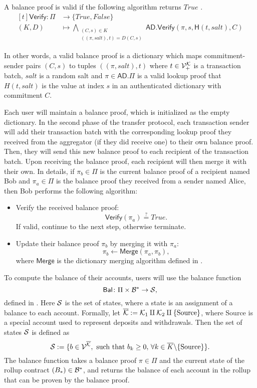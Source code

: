 A balance proof is valid if the following algorithm returns \(True\) \href{https://github.com/\repo FVIntmax/BalanceProof.lean#L60}{\ExternalLink}.
\[
	\begin{aligned}[t]
		\mathsf{Verify} \colon \Pi & \to \{True,False\}                       \\
		(K,D)                      & \mapsto \bigwedge_{\substack{(C,s) \in K \\ ((\pi,salt), t) = D(C,s)}} \mathsf{AD.Verify}(\pi,s,\mathsf{H}(t,salt),C)
	\end{aligned}\]

In other words, a valid balance proof is a dictionary which maps commitment-sender pairs \((C,s)\) to tuples \(((\pi,salt), t)\) where \(t \in \V_+^{\K}\) is a transaction batch, \(salt\) is a random salt and \(\pi \in \mathsf{AD}.\Pi\) is a valid lookup proof that \(H(t,salt)\) is the value at index \(s\) in an authenticated dictionary with commitment \(C\).

Each user will maintain a balance proof, which is initialized as the empty dictionary. In the second phase of the transfer protocol, each transaction sender will add their transaction batch with the corresponding lookup proof they received from the aggregator (if they did receive one) to their own balance proof. Then, they will send this new balance proof to each recipient of the transaction batch. Upon receiving the balance proof, each recipient will then merge it with their own. In details, if \(\pi_b \in \Pi\) is the current balance proof of a recipient named Bob and \(\pi_a \in \Pi\) is the balance proof they received from a sender named Alice, then Bob performs the following algorithm:

\begin{itemize}
	\item Verify the received balance proof: \[\mathsf{Verify}(\pi_a) \stackrel{?}{=} True.\] If valid, continue to the next step, otherwise terminate.
	\item Update their balance proof \(\pi_b\) by merging it with \(\pi_a\): \[\pi_b \leftarrow \mathsf{Merge}(\pi_a, \pi_b),\] where \(\mathsf{Merge}\) is the dictionary merging algorithm defined in .
\end{itemize}

To compute the balance of their accounts, users will use the balance function \[\mathsf{Bal} \colon \Pi \times \B^* \to \S,\] defined in . Here \(\S\) is the set of states, where a state is an assignment of a balance to each account. Formally, let \(\overline{\K} := \K_1 \amalg \K_2 \amalg \{\source\}\), where Source is a special account used to represent deposits and withdrawals. Then the set of states \(\S\) is defined \href{https://github.com/\repo FVIntmax/State.lean#L31}{\ExternalLink}as \[\S := \{b \in \V^{\overline{\K}}, \text{ such that } b_k \geq 0,\, \forall k \in \overline{K}\backslash \{\source\}\}.\] The balance function takes a balance proof \(\pi \in \Pi\) and the current state of the rollup contract \((B_*) \in \B^*\), and returns the balance of each account in the rollup that can be proven by the balance proof.

